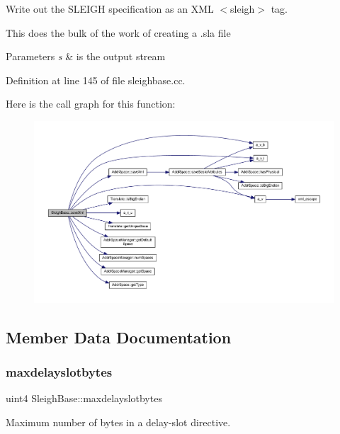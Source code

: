Write out the S\+L\+E\+I\+GH specification as an X\+ML $<$sleigh$>$ tag. 

This does the bulk of the work of creating a .sla file 
\begin{DoxyParams}{Parameters}
{\em s} & is the output stream \\
\hline
\end{DoxyParams}


Definition at line 145 of file sleighbase.\+cc.

Here is the call graph for this function\+:
\nopagebreak
\begin{figure}[H]
\begin{center}
\leavevmode
\includegraphics[width=350pt]{class_sleigh_base_a2231c60a93b577e7bd844b97ac0ef60f_cgraph}
\end{center}
\end{figure}


\subsection{Member Data Documentation}
\mbox{\label{class_sleigh_base_aeaa260676163d56933c45d67243b74c3}} 
\subsubsection{\texorpdfstring{maxdelayslotbytes}{maxdelayslotbytes}}
{\footnotesize\ttfamily uint4 Sleigh\+Base\+::maxdelayslotbytes\hspace{0.3cm}{\ttfamily [protected]}}



Maximum number of bytes in a delay-\/slot directive. 



